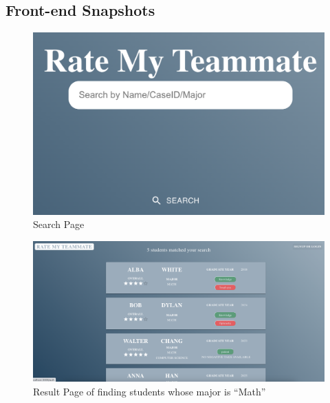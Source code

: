\documentclass[12pt]{article}
\begin{document}
\subsection{Front-end Snapshots}
\begin{figure}[h]
    \centering
    \includegraphics[scale=0.6]{search.png}
    \caption{Search Page}
    \label{fig:search}
\end{figure}

\begin{figure}[h]
    \centering
    \includegraphics[scale=0.3]{result.png}
    \caption{Result Page of finding students whose major is ``Math''}
    \label{fig:result}
\end{figure}
\end{document}
